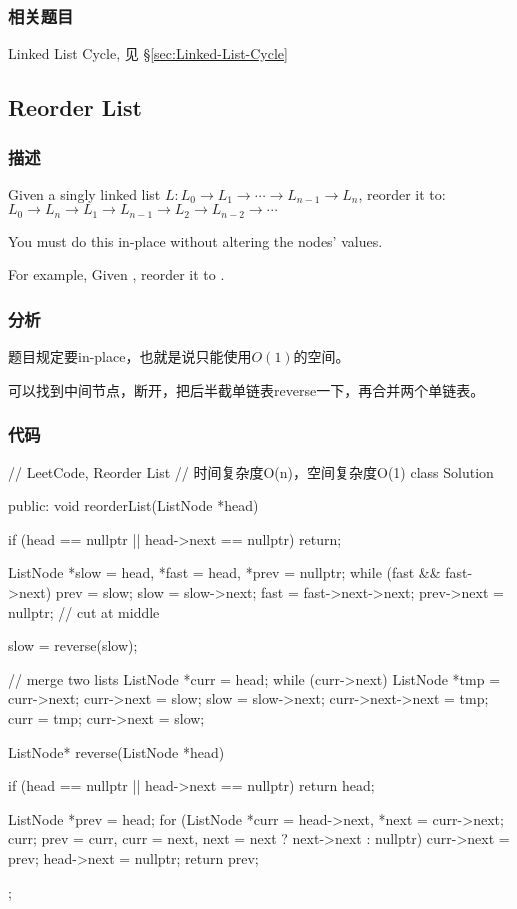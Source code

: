 \subsubsection{相关题目}
\begindot
\item Linked List Cycle, 见 \S \ref{sec:Linked-List-Cycle}
\myenddot


\subsection{Reorder List}
\label{sec:reorder-list}


\subsubsection{描述}
Given a singly linked list $L: L_0 \rightarrow L_1 \rightarrow \cdots \rightarrow L_{n-1} \rightarrow L_n$,
reorder it to: $L_0 \rightarrow L_n \rightarrow L_1 \rightarrow L_{n-1} \rightarrow L_2 \rightarrow L_{n-2} \rightarrow \cdots$

You must do this in-place without altering the nodes' values.

For example,
Given , reorder it to .


\subsubsection{分析}
题目规定要in-place，也就是说只能使用$O(1)$的空间。

可以找到中间节点，断开，把后半截单链表reverse一下，再合并两个单链表。


\subsubsection{代码}
\begin{Code}
// LeetCode, Reorder List
// 时间复杂度O(n)，空间复杂度O(1)
class Solution {
public:
    void reorderList(ListNode *head) {
        if (head == nullptr || head->next == nullptr) return;

        ListNode *slow = head, *fast = head, *prev = nullptr;
        while (fast && fast->next) {
            prev = slow;
            slow = slow->next;
            fast = fast->next->next;
        }
        prev->next = nullptr; // cut at middle

        slow = reverse(slow);

        // merge two lists
        ListNode *curr = head;
        while (curr->next) {
            ListNode *tmp = curr->next;
            curr->next = slow;
            slow = slow->next;
            curr->next->next = tmp;
            curr = tmp;
        }
        curr->next = slow;
    }

    ListNode* reverse(ListNode *head) {
        if (head == nullptr || head->next == nullptr) return head;

        ListNode *prev = head;
        for (ListNode *curr = head->next, *next = curr->next; curr;
            prev = curr, curr = next, next = next ? next->next : nullptr) {
                curr->next = prev;
        }
        head->next = nullptr;
        return prev;
    }
};
\end{Code}


